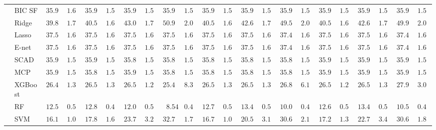 \begin{tabular}{p{0.2cm}p{1cm}|p{0.6cm}p{0.6cm}|p{0.6cm}p{0.6cm}p{0.6cm}p{0.6cm}p{0.6cm}p{0.6cm}|p{0.6cm}p{0.6cm}p{0.6cm}p{0.6cm}p{0.6cm}p{0.6cm}|p{0.6cm}p{0.6cm}p{0.6cm}p{0.6cm}p{0.6cm}p{0.6cm}}
 & BIC SF  & $35.95$ & $1.60$ & $35.93$ & $1.58$ & $35.95$ & $1.56$ & $35.95$ & $1.58$ & $35.94$ & $1.57$ & $35.93$ & $1.56$ & $35.94$ & $1.58$ & $35.95$ & $1.57$ & $35.95$ & $1.57$ & $35.94$ & $1.57$ \\
 & Ridge  & $39.89$ & $1.73$ & $40.57$ & $1.68$ & $43.03$ & $1.79$ & $50.97$ & $2.04$ & $40.54$ & $1.69$ & $42.64$ & $1.72$ & $49.55$ & $2.09$ & $40.53$ & $1.68$ & $42.61$ & $1.74$ & $49.95$ & $2.01$ \\
 & Lasso  & $37.57$ & $1.67$ & $37.54$ & $1.66$ & $37.53$ & $1.67$ & $37.53$ & $1.68$ & $37.51$ & $1.66$ & $37.54$ & $1.65$ & $37.45$ & $1.66$ & $37.54$ & $1.65$ & $37.52$ & $1.65$ & $37.44$ & $1.67$ \\
 & E-net  & $37.57$ & $1.67$ & $37.54$ & $1.66$ & $37.53$ & $1.68$ & $37.54$ & $1.68$ & $37.51$ & $1.67$ & $37.55$ & $1.65$ & $37.45$ & $1.67$ & $37.54$ & $1.66$ & $37.53$ & $1.66$ & $37.43$ & $1.66$ \\
 & SCAD  & $35.91$ & $1.57$ & $35.90$ & $1.57$ & $35.89$ & $1.57$ & $35.89$ & $1.58$ & $35.89$ & $1.58$ & $35.89$ & $1.58$ & $35.89$ & $1.56$ & $35.91$ & $1.57$ & $35.90$ & $1.59$ & $35.90$ & $1.57$ \\
 & MCP  & $35.91$ & $1.56$ & $35.89$ & $1.56$ & $35.90$ & $1.58$ & $35.89$ & $1.58$ & $35.89$ & $1.57$ & $35.89$ & $1.59$ & $35.88$ & $1.56$ & $35.91$ & $1.57$ & $35.90$ & $1.59$ & $35.90$ & $1.57$ \\
 & XGBoost  & $26.48$ & $1.34$ & $26.56$ & $1.33$ & $26.55$ & $1.21$ & $25.45$ & $8.34$ & $26.56$ & $1.38$ & $26.50$ & $1.36$ & $26.82$ & $6.10$ & $26.56$ & $1.24$ & $26.59$ & $1.33$ & $27.96$ & $3.00$ \\
 & RF  & $12.54$ & $0.50$ & $12.80$ & $0.47$ & $12.01$ & $0.50$ & $\phantom{0}8.54$ & $0.41$ & $12.73$ & $0.54$ & $13.41$ & $0.53$ & $10.02$ & $0.44$ & $12.69$ & $0.55$ & $13.49$ & $0.55$ & $10.55$ & $0.48$ \\
 & SVM  & $16.16$ & $1.04$ & $17.81$ & $1.68$ & $23.79$ & $3.20$ & $32.74$ & $1.72$ & $16.77$ & $1.06$ & $20.59$ & $3.10$ & $30.65$ & $2.15$ & $17.29$ & $1.38$ & $22.72$ & $3.48$ & $30.66$ & $1.84$ \\
\hline 
\end{tabular}

